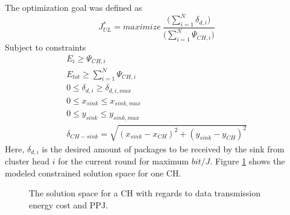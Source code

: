 \noindent The optimization goal was defined as
\begin{equation}
    J_{UL}^{*} = maximize\:\frac{\Big( \sum_{i=1}^{N} \delta_{d,i}\Big)}{\Big( \sum_{i=1}^{N} \Psi_{CH,i}\Big)}
\end{equation}
Subject to constraints
\begin{align}
    E_i \geq \Psi_{CH,i}\\
    E_{tot} \geq \sum_{i=1}^{N} \Psi_{CH,i}\\
    0\leq\delta_{d,i}\geq\delta_{d,i,max} \\
    0\leq x_{sink} \leq x_{sink,max} \\
    0\leq y_{sink} \leq y_{sink,max} \\
    \delta_{CH-sink} = \sqrt{(x_{sink}-x_{CH})^{2} + (y_{sink}-y_{CH})^{2}} \label{eq:deltaCHsink}
\end{align}
Here, $\delta_{d,i}$ is the desired amount of packages to be received by the sink from cluster head $i$ for the current round for maximum $bit/J$. Figure \ref{fig:optimizationProbMatlab} shows the modeled constrained solution space for one CH.

\begin{figure}[h]
  \centering
  \hfill
  \caption{The solution space for a CH with regards to data transmission energy cost and PPJ.}
  \label{fig:optimizationProbMatlab}
\end{figure}





